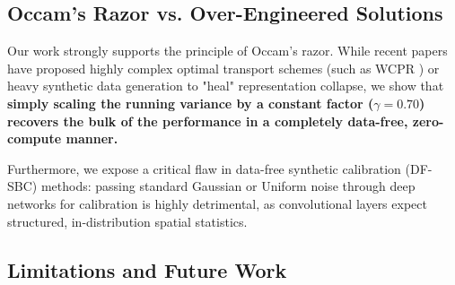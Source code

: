 \documentclass{article}
\theoremstyle{plain}
\theoremstyle{definition}
\theoremstyle{remark}
\begin{document}
\subsection{Occam's Razor vs. Over-Engineered Solutions}

Our work strongly supports the principle of Occam's razor. While recent papers have proposed highly complex optimal transport schemes (such as WCPR \cite{theorist_wasserstein}) or heavy synthetic data generation to "heal" representation collapse, we show that \textbf{simply scaling the running variance by a constant factor ($\gamma=0.70$) recovers the bulk of the performance in a completely data-free, zero-compute manner.}

Furthermore, we expose a critical flaw in data-free synthetic calibration (DF-SBC) methods: passing standard Gaussian or Uniform noise through deep networks for calibration is highly detrimental, as convolutional layers expect structured, in-distribution spatial statistics.

\subsection{Limitations and Future Work}
\label{sec:limitations}
\end{document}
